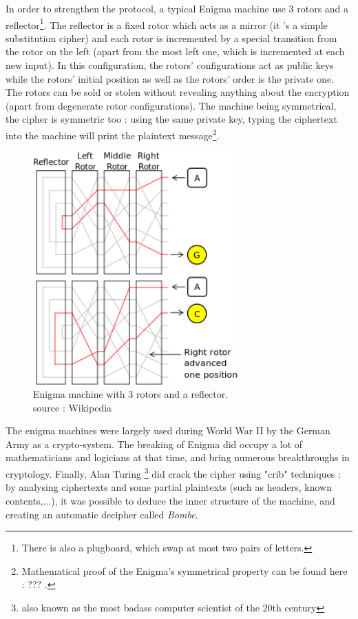 In order to strengthen the protocol, a typical Enigma machine use 3 rotors and a reflector\footnote{There is also a plugboard, which swap at most two pairs of letters.}. The reflector is a fixed rotor which acts as a mirror (it 's a simple substitution cipher) and each rotor is incremented by a special transition from the rotor on the left (apart from the most left one, which is incremented at each new input). In this configuration, the rotors' configurations act as public keys while the rotors' initial position as well as the rotors' order is the private one. The rotors can be sold or stolen without revealing anything about the encryption (apart from degenerate rotor configurations). The machine being symmetrical, the cipher is symmetric too : using the same private key, typing the ciphertext into the machine will print the plaintext message\footnote{Mathematical proof of the Enigma's symmetrical property can be found here : ??? .}.


\begin{figure}[ht!]
    \centering
        \includegraphics[width=0.7\textwidth]{images/Enigma_3rotors}
    \caption{ Enigma machine with 3 rotors and a reflector.\\ source : Wikipedia}
	\label{fig:enigma_3rotors}
\end{figure}

The enigma machines were largely used during World War II by the German Army as a crypto-system. The breaking of Enigma did occupy a lot of mathematicians and logicians at that time, and bring numerous breakthroughs in cryptology. Finally, Alan Turing \footnote{also known as the most badass computer scientist of the 20th century} did crack the cipher using "crib" techniques : by analysing ciphertexts and some partial plaintexts (such as headers, known contents,...), it was possible to deduce the inner structure of the machine, and creating an automatic decipher called \emph{Bombe}.






